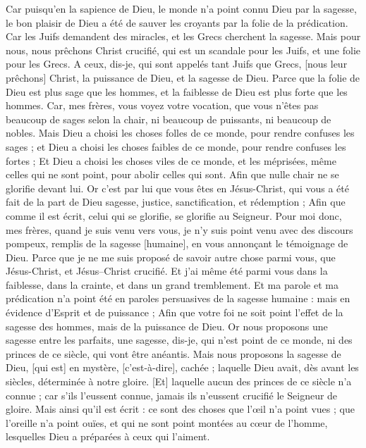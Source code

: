 \begin{multicols}{2}
Car puisqu'en la sapience de Dieu, le monde n'a point connu Dieu par la sagesse, le bon plaisir de Dieu a été de sauver les croyants par la folie de la prédication.
Car les Juifs demandent des miracles, et les Grecs cherchent la sagesse.
Mais pour nous, nous prêchons Christ crucifié, qui est un scandale pour les Juifs, et une folie pour les Grecs.
A ceux, dis-je, qui sont appelés tant Juifs que Grecs, [nous leur prêchons] Christ, la puissance de Dieu, et la sagesse de Dieu.
Parce que la folie de Dieu est plus sage que les hommes, et la faiblesse de Dieu est plus forte que les hommes.
Car, mes frères, vous voyez votre vocation, que vous n'êtes pas beaucoup de sages selon la chair, ni beaucoup de puissants, ni beaucoup de nobles.
Mais Dieu a choisi les choses folles de ce monde, pour rendre confuses les sages ; et Dieu a choisi les choses faibles de ce monde, pour rendre confuses les fortes ;
Et Dieu a choisi les choses viles de ce monde, et les méprisées, même celles qui ne sont point, pour abolir celles qui sont.
Afin que nulle chair ne se glorifie devant lui.
Or c'est par lui que vous êtes en Jésus-Christ, qui vous a été fait de la part de Dieu sagesse, justice, sanctification, et rédemption ;
Afin que comme il est écrit, celui qui se glorifie, se glorifie au Seigneur.
\VerseOne{}Pour moi donc, mes frères, quand je suis venu vers vous, je n'y suis point venu avec des discours pompeux, remplis de la sagesse [humaine], en vous annonçant le témoignage de Dieu.
Parce que je ne me suis proposé de savoir autre chose parmi vous, que Jésus-Christ, et Jésus–Christ crucifié.
Et j'ai même été parmi vous dans la faiblesse, dans la crainte, et dans un grand tremblement.
Et ma parole et ma prédication n'a point été en paroles persuasives de la sagesse humaine : mais en évidence d'Esprit et de puissance ;
Afin que votre foi ne soit point l'effet de la sagesse des hommes, mais de la puissance de Dieu.
Or nous proposons une sagesse entre les parfaits, une sagesse, dis-je, qui n'est point de ce monde, ni des princes de ce siècle, qui vont être anéantis.
Mais nous proposons la sagesse de Dieu, [qui est] en mystère, [c'est-à-dire], cachée ; laquelle Dieu avait, dès avant les siècles, déterminée à notre gloire.
[Et] laquelle aucun des princes de ce siècle n'a connue ; car s'ils l'eussent connue, jamais ils n'eussent crucifié le Seigneur de gloire.
Mais ainsi qu'il est écrit : ce sont des choses que l'œil n'a point vues ; que l'oreille n'a point ouïes, et qui ne sont point montées au cœur de l'homme, lesquelles Dieu a préparées à ceux qui l’aiment.

\end{multicols}
